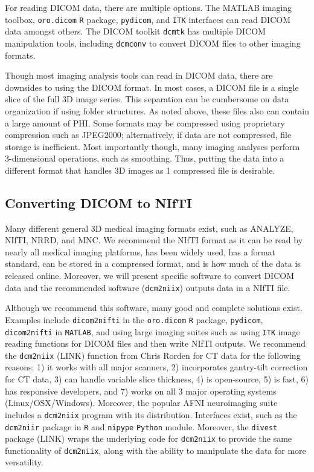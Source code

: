 \documentclass[]{elsarticle} %
\begin{document}
For reading DICOM data, there are multiple options. The MATLAB imaging
toolbox, \texttt{oro.dicom} \texttt{R} package, \texttt{pydicom}, and
\texttt{ITK} interfaces can read DICOM data amongst others. The DICOM
toolkit \texttt{dcmtk} has multiple DICOM manipulation tools, including
\texttt{dcmconv} to convert DICOM files to other imaging formats.

Though most imaging analysis tools can read in DICOM data, there are
downsides to using the DICOM format. In most cases, a DICOM file is a
single slice of the full 3D image series. This separation can be
cumbersome on data organization if using folder structures. As noted
above, these files also can contain a large amount of PHI. Some formats
may be compressed using proprietary compression such as JPEG2000;
alternatively, if data are not compressed, file storage is inefficient.
Most importantly though, many imaging analyses perform 3-dimensional
operations, such as smoothing. Thus, putting the data into a different
format that handles 3D images as 1 compressed file is desirable.

\hypertarget{converting-dicom-to-nifti}{%
\subsection{Converting DICOM to NIfTI}\label{converting-dicom-to-nifti}}

Many different general 3D medical imaging formats exist, such as
ANALYZE, NIfTI, NRRD, and MNC. We recommend the NIfTI format as it can
be read by nearly all medical imaging platforms, has been widely used,
has a format standard, can be stored in a compressed format, and is how
much of the data is released online. Moreover, we will present specific
software to convert DICOM data and the recommended software
(\texttt{dcm2niix}) outputs data in a NIfTI file.

Although we recommend this software, many good and complete solutions
exist. Examples include \texttt{dicom2nifti} in the \texttt{oro.dicom}
\texttt{R} package, \texttt{pydicom}, \texttt{dicom2nifti} in
\texttt{MATLAB}, and using large imaging suites such as using
\texttt{ITK} image reading functions for DICOM files and then write
NIfTI outputs. We recommend the \texttt{dcm2niix} (LINK) function from
Chris Rorden for CT data for the following reasons: 1) it works with all
major scanners, 2) incorporates gantry-tilt correction for CT data, 3)
can handle variable slice thickness, 4) is open-source, 5) is fast, 6)
has responsive developers, and 7) works on all 3 major operating systems
(Linux/OSX/Windows). Moreover, the popular AFNI neuroimaging suite
includes a \texttt{dcm2niix} program with its distribution. Interfaces
exist, such as the \texttt{dcm2niir} package in \texttt{R} and
\texttt{nipype} \texttt{Python} module. Moreover, the \texttt{divest}
package (LINK) wraps the underlying code for \texttt{dcm2niix} to
provide the same functionality of \texttt{dcm2niix}, along with the
ability to manipulate the data for more versatility.
\end{document}
